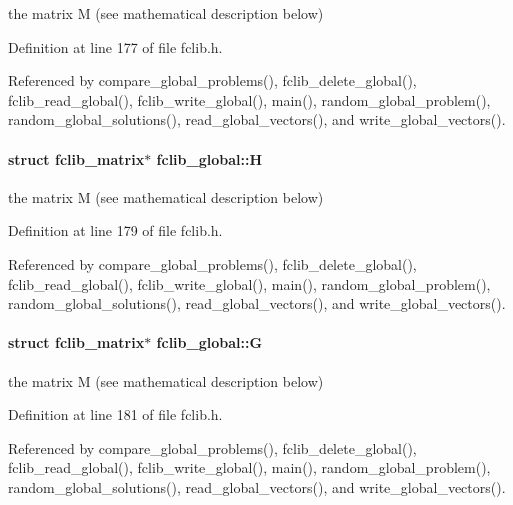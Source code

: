 the matrix M (see mathematical description below) 



Definition at line 177 of file fclib.\-h.



Referenced by compare\-\_\-global\-\_\-problems(), fclib\-\_\-delete\-\_\-global(), fclib\-\_\-read\-\_\-global(), fclib\-\_\-write\-\_\-global(), main(), random\-\_\-global\-\_\-problem(), random\-\_\-global\-\_\-solutions(), read\-\_\-global\-\_\-vectors(), and write\-\_\-global\-\_\-vectors().

\hypertarget{structfclib__global_ac87d5553d144625b9006e2e8b0c89b3c}{
\paragraph[{H}]{\setlength{\rightskip}{0pt plus 5cm}struct {\bf fclib\-\_\-matrix}$\ast$ fclib\-\_\-global\-::\-H}}\label{structfclib__global_ac87d5553d144625b9006e2e8b0c89b3c}


the matrix M (see mathematical description below) 



Definition at line 179 of file fclib.\-h.



Referenced by compare\-\_\-global\-\_\-problems(), fclib\-\_\-delete\-\_\-global(), fclib\-\_\-read\-\_\-global(), fclib\-\_\-write\-\_\-global(), main(), random\-\_\-global\-\_\-problem(), random\-\_\-global\-\_\-solutions(), read\-\_\-global\-\_\-vectors(), and write\-\_\-global\-\_\-vectors().

\hypertarget{structfclib__global_a897c09aca4a010076ed9ddb3f7527a79}{
\paragraph[{G}]{\setlength{\rightskip}{0pt plus 5cm}struct {\bf fclib\-\_\-matrix}$\ast$ fclib\-\_\-global\-::\-G}}\label{structfclib__global_a897c09aca4a010076ed9ddb3f7527a79}


the matrix M (see mathematical description below) 



Definition at line 181 of file fclib.\-h.



Referenced by compare\-\_\-global\-\_\-problems(), fclib\-\_\-delete\-\_\-global(), fclib\-\_\-read\-\_\-global(), fclib\-\_\-write\-\_\-global(), main(), random\-\_\-global\-\_\-problem(), random\-\_\-global\-\_\-solutions(), read\-\_\-global\-\_\-vectors(), and write\-\_\-global\-\_\-vectors().

